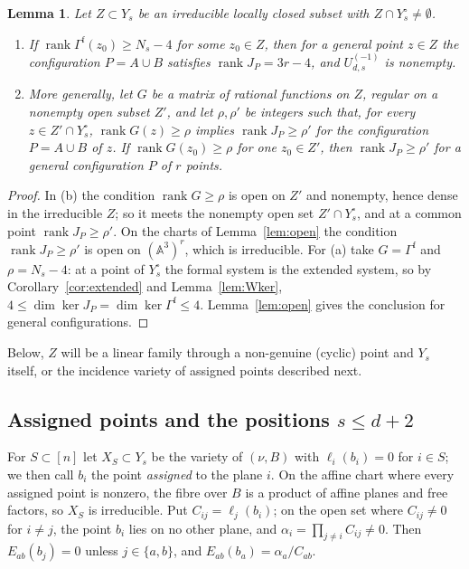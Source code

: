 \documentclass{amsart}
\newtheorem{lemma}[theorem]{Lemma}
\theoremstyle{definition}
\theoremstyle{remark}
\numberwithin{equation}{section}
\newcommand{\A}{\mathbb{A}}
\DeclareMathOperator{\rank}{rank}
\begin{document}
\begin{lemma}\label{lem:transfer}
Let $Z\subset Y_s$ be an irreducible locally closed subset with $Z\cap Y_s^\circ\ne
\emptyset$.
\begin{enumerate}[label=\textup{(\alph*)}]
\item If $\rank\Gamma^{\mathrm f}(z_0)\ge N_s-4$ for some $z_0\in Z$, then for a
general point $z\in Z$ the configuration $P=A\cup B$ satisfies $\rank J_P=3r-4$, and
$U^{(-1)}_{d,s}$ is nonempty.
\item More generally, let $G$ be a matrix of rational functions on $Z$, regular on a
nonempty open subset $Z'$, and let $\rho,\rho'$ be integers such that, for every
$z\in Z'\cap Y_s^\circ$, $\rank G(z)\ge\rho$ implies $\rank J_P\ge\rho'$ for the
configuration $P=A\cup B$ of $z$. If $\rank G(z_0)\ge\rho$ for one $z_0\in Z'$, then
$\rank J_P\ge\rho'$ for a general configuration $P$ of $r$ points.
\end{enumerate}
\end{lemma}

\begin{proof}
In (b) the condition $\rank G\ge\rho$ is open on $Z'$ and nonempty, hence dense in the
irreducible $Z$; so it meets the nonempty open set $Z'\cap Y_s^\circ$, and at a common
point $\rank J_P\ge\rho'$. On the charts of Lemma~\ref{lem:open} the condition
$\rank J_P\ge\rho'$ is open on $(\A^3)^r$, which is irreducible. For (a) take
$G=\Gamma^{\mathrm f}$ and $\rho=N_s-4$: at a point of $Y_s^\circ$ the formal system
is the extended system, so by Corollary~\ref{cor:extended} and
Lemma~\ref{lem:Wker}, $4\le\dim\ker J_P=\dim\ker\Gamma^{\mathrm f}\le4$.
Lemma~\ref{lem:open} gives the conclusion for general configurations.
\end{proof}

Below, $Z$ will be a linear family through a non-genuine (cyclic) point and $Y_s$
itself, or the incidence variety of assigned points described next.

\subsection{Assigned points and the positions \texorpdfstring{$s\le d+2$}{s <= d+2}}\label{sec:outer}
For $S\subset[n]$ let $X_S\subset Y_s$ be the variety of $(\nu,B)$ with
$\ell_i(b_i)=0$ for $i\in S$; we then call $b_i$ the point \emph{assigned} to the plane
$i$. On the affine chart where every assigned point is nonzero, the fibre over $B$ is
a product of affine planes and free factors, so $X_S$ is irreducible. Put
$C_{ij}=\ell_j(b_i)$; on the open set where $C_{ij}\ne0$ for $i\ne j$, the point $b_i$
lies on no other plane, and $\alpha_i=\prod_{j\ne i}C_{ij}\ne0$. Then
$E_{ab}(b_j)=0$ unless $j\in\{a,b\}$, and $E_{ab}(b_a)=\alpha_a/C_{ab}$.
\end{document}
